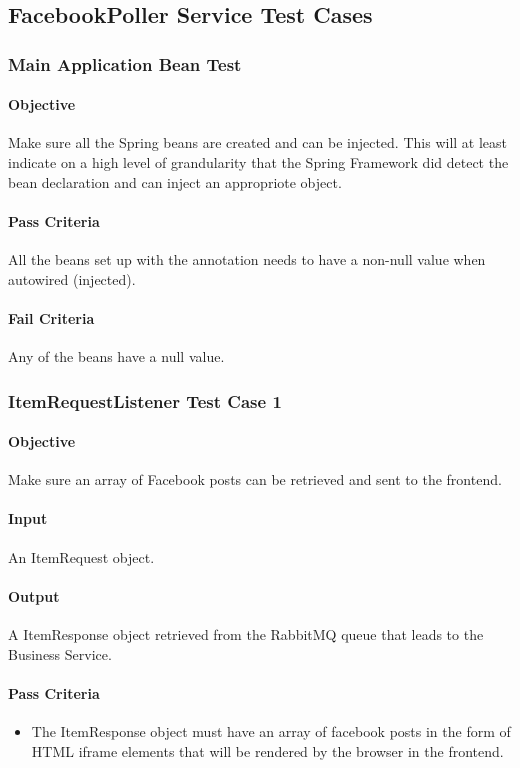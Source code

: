 \documentclass[hidelinks,english]{article}
\begin{document}
	\subsection{FacebookPoller Service Test Cases}
		\subsubsection{Main Application Bean Test}\label{facebookapplicationbeanstest}
			\paragraph{Objective} Make sure all the Spring beans are created and can be injected. This will at least indicate on a high level of grandularity that the Spring Framework did detect the bean declaration and can inject an appropriote object.
			\paragraph{Pass Criteria} All the beans set up with the \emph{\@Bean} annotation needs to have a non-null value when autowired (injected).
			\paragraph{Fail Criteria} Any of the beans have a null value.
			
		\subsubsection{ItemRequestListener Test Case 1}\label{facebookitemlistenertest1}
			\paragraph{Objective} Make sure an array of Facebook posts can be retrieved and sent to the frontend.
			\paragraph{Input} An ItemRequest object.
			\paragraph{Output} A ItemResponse object retrieved from the RabbitMQ queue that leads to the Business Service.
			\paragraph{Pass Criteria}
			\begin{itemize}
				\item The ItemResponse object must have an array of facebook posts in the form of HTML iframe elements that will be rendered by the browser in the frontend.
			\end{itemize}
\end{document}
